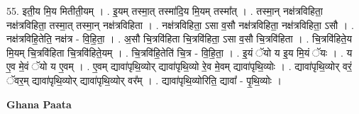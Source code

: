 \documentclass[17pt]{extarticle}
\begin{document}
55. इती॒य मि॒य मितीती॒यम् । . इ॒यम् तस्मा॒त् तस्मा॑दि॒य मि॒यम् तस्मा᳚त् । . तस्मा॒न् नक्ष॑त्रविहिता॒ नक्ष॑त्रविहिता॒ तस्मा॒त् तस्मा॒न् नक्ष॑त्रविहिता । . नक्ष॑त्रविहिता॒ ऽसा व॒सौ नक्ष॑त्रविहिता॒ नक्ष॑त्रविहिता॒ ऽसौ । . नक्ष॑त्रविहि॒तेति॒ नक्ष॑त्र - वि॒हि॒ता॒ । . अ॒सौ चि॒त्रवि॑हिता चि॒त्रवि॑हिता॒ ऽसा व॒सौ चि॒त्रवि॑हिता । . चि॒त्रवि॑हिते॒य मि॒यम् चि॒त्रवि॑हिता चि॒त्रवि॑हिते॒यम् । . चि॒त्रवि॑हि॒तेति॑ चि॒त्र - वि॒हि॒ता॒ । . इ॒यं ॅयो य इ॒य मि॒यं ॅयः । . य ए॒व मे॒वं ॅयो य ए॒वम् । . ए॒वम् द्यावा॑पृथि॒व्योर् द्यावा॑पृथि॒व्यो रे॒व मे॒वम् द्यावा॑पृथि॒व्योः । . द्यावा॑पृथि॒व्योर् वरं॒ ॅवर॒म् द्यावा॑पृथि॒व्योर् द्यावा॑पृथि॒व्योर् वर᳚म् । . द्यावा॑पृथि॒व्योरिति॒ द्यावा᳚ - पृ॒थि॒व्योः । \newline

\textbf{Ghana Paata } \newline
\end{document}
